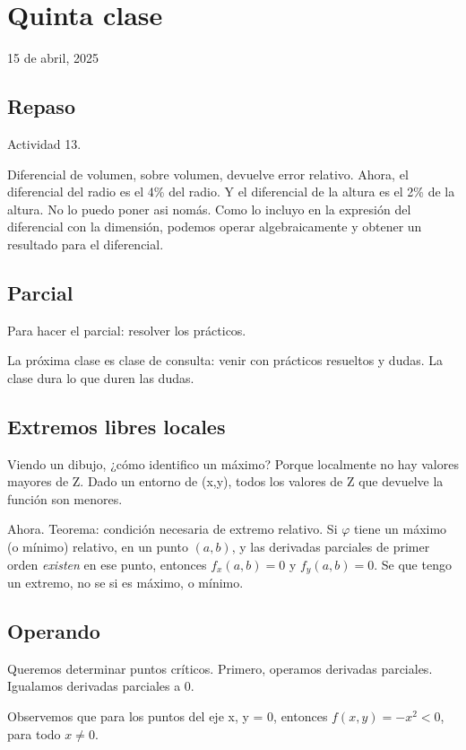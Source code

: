 \section{Quinta clase}

15 de abril, 2025

\subsection{Repaso}

Actividad 13.

Diferencial de volumen, sobre volumen, devuelve error relativo.
Ahora, el diferencial del radio es el 4\% del radio.
Y el diferencial de la altura es el 2\% de la altura.
No lo puedo poner asi nomás.
Como lo incluyo en la expresión del diferencial con la dimensión,
podemos operar algebraicamente y obtener un resultado para el diferencial.

\subsection{Parcial}

Para hacer el parcial: resolver los prácticos.

La próxima clase es clase de consulta: venir con prácticos resueltos y dudas.
La clase dura lo que duren las dudas.

\subsection{Extremos libres locales}

Viendo un dibujo, ¿cómo identifico un máximo?
Porque localmente no hay valores mayores de Z.
Dado un entorno de (x,y), todos los valores de Z que devuelve la función son menores.

Ahora.
Teorema: condición necesaria de extremo relativo. 
Si \(\varphi\) tiene un máximo (o mínimo) relativo,
en un punto \((a,b)\),
y las derivadas parciales de primer orden \textit{existen} en ese punto,
entonces \(f_x(a,b) = 0\) y \(f_y(a,b) = 0\).
Se que tengo un extremo, no se si es máximo, o mínimo.

\subsection{Operando}

Queremos determinar puntos críticos. 
Primero, operamos derivadas parciales.
Igualamos derivadas parciales a 0.

Observemos que para los puntos del eje x, y = 0, entonces \(f(x,y) = -x^2 < 0\),
para todo \(x \neq 0\).

